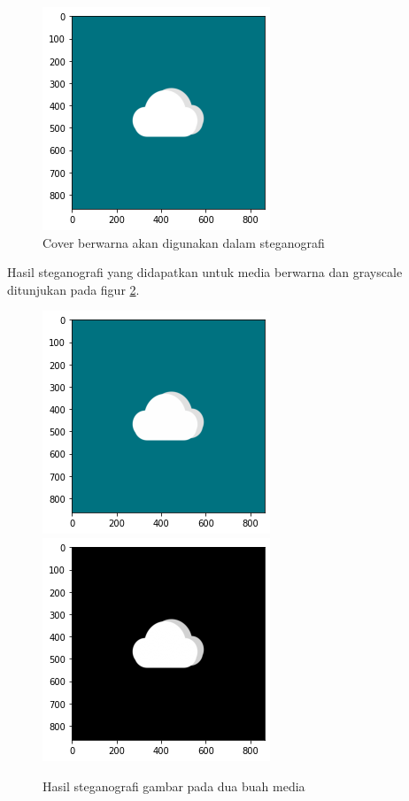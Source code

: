 \documentclass[10pt,conference]{IEEEtran}
\theoremstyle{definition}
\begin{document}
\begin{figure}
    \centerline{\includegraphics[width=0.5\columnwidth]{cloud-original-warna.png}}
    \caption{Cover berwarna akan digunakan dalam steganografi}
    \label{fig:cloudcol} 
\end{figure}

Hasil steganografi yang didapatkan untuk media berwarna dan grayscale ditunjukan pada figur \ref{fig:result2}.

\begin{figure}
    \centerline{
        \includegraphics[width=0.5\columnwidth]{cloud-hasil-75000.png}
        \includegraphics[width=0.5\columnwidth]{cloud-hasil-75000-s.png}
    }
    \caption{Hasil steganografi gambar pada dua buah media}
    \label{fig:result2} 
\end{figure}
\end{document}

